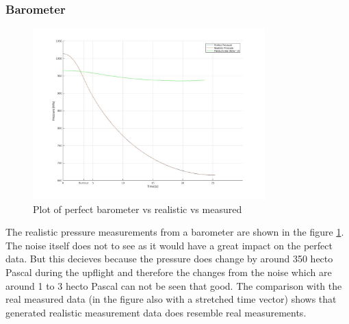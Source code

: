 \subsubsection{Barometer}
\begin{figure}[h!]
 \centering
 \includegraphics[width=0.8\textwidth]{./Pictures/PressurePerfVSReal.jpg}
 \caption{Plot of perfect barometer vs realistic vs measured}
 \label{fig:PressurePerfVSReal}
\end{figure}
The realistic pressure measurements from a barometer are shown in the figure \ref{fig:PressurePerfVSReal}.
The noise itself does not to see as it would have a great impact on the perfect data.
But this decieves because the pressure does change by around 350 hecto Pascal during the upflight
and therefore the changes from the noise which are around 1 to 3 hecto Pascal can not be seen that good.
The comparison with the real measured data (in the figure also with a stretched time vector) shows that generated realistic measurement data does resemble real measurements.


